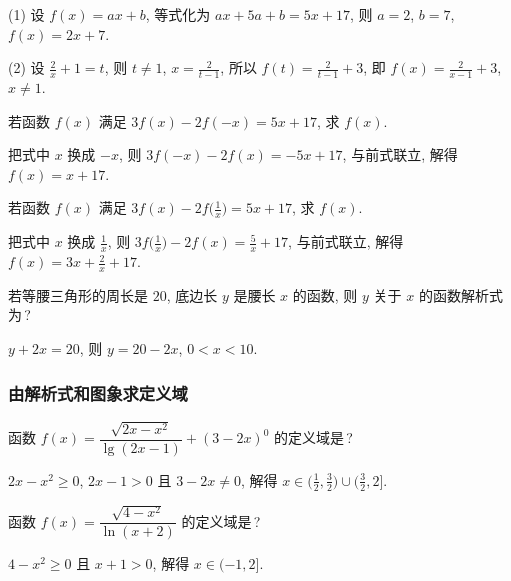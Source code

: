  \beginsolution
    (1) 设 $f(x)=ax+b$, 等式化为 $ax+5a+b=5x+17$, 则 $a=2$, $b=7$, $f(x)=2x+7$.
    
    (2) 设 $\frac2x+1=t$, 则 $t\neq1$, $x=\frac2{t-1}$, 所以 $f(t)=\frac2{t-1}+3$, 即 $f(x)=\frac2{x-1}+3$, $x\neq 1$.
    
    \varexercise 若函数 $f(x)$ 满足 $3f(x)-2f(-x)=5x+17$, 求 $f(x)$.
    
    把式中 $x$ 换成 $-x$, 则 $3f(-x)-2f(x)=-5x+17$, 与前式联立, 解得 $f(x)=x+17$.
    
    \varexercise 若函数 $f(x)$ 满足 $3f(x)-2f\Big(\frac1x\Big)=5x+17$, 求 $f(x)$.
    
    把式中 $x$ 换成 $\frac1x$, 则 $3f\Big(\frac1x\Big)-2f(x)=\frac5x+17$, 与前式联立, 解得 $f(x)=3x+\frac2x+17$.
  \endsolution
  
  \begin{exercise}
    若等腰三角形的周长是 $20$, 底边长 $y$ 是腰长 $x$ 的函数,
    则 $y$ 关于 $x$ 的函数解析式为\,?
  \end{exercise}

  \beginsolution
    $y+2x=20$, 则 $y=20-2x$, $0<x<10$.
  \endsolution
  
  \subsubsection{由解析式和图象求定义域}
  \begin{example}
    函数 $f(x)=\dfrac{\sqrt{2x-x^2}}{\lg(2x-1)}+(3-2x)^0$ 的定义域是\,?
  \end{example}

  \beginsolution
    $2x-x^2\geqslant0$, $2x-1>0$ 且  $3-2x\neq 0$, 解得 $x\in\Big(\frac12,\frac32\Big)\cup\Big(\frac32,2\Big]$.
  \endsolution
  
  \lianxi
  \begin{exercise}
    函数 $f(x)=\dfrac{\sqrt{4-x^2}}{\ln(x+2)}$ 的定义域是\,?
  \end{exercise}

  \beginsolution
    $4-x^2\geqslant 0$ 且 $x+1>0$, 解得 $x\in(-1,2]$.
  \endsolution
  
